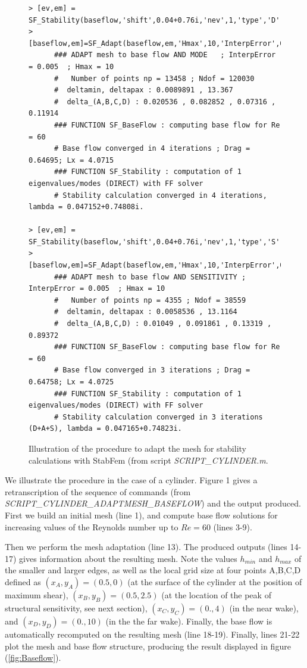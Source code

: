 \documentclass[twocolumn,10pt]{asme2ej}
\begin{document}
\begin{figure}
\small
\begin{lstlisting}
> [ev,em] = SF_Stability(baseflow,'shift',0.04+0.76i,'nev',1,'type','D');
> [baseflow,em]=SF_Adapt(baseflow,em,'Hmax',10,'InterpError',0.005);  
      ### ADAPT mesh to base flow AND MODE   ; InterpError = 0.005  ; Hmax = 10
      #   Number of points np = 13458 ; Ndof = 120030
      #  deltamin, deltapax : 0.0089891 , 13.367
      #  delta_(A,B,C,D) : 0.020536 , 0.082852 , 0.07316 , 0.11914
      ### FUNCTION SF_BaseFlow : computing base flow for Re = 60
      # Base flow converged in 4 iterations ; Drag = 0.64695; Lx = 4.0715
      ### FUNCTION SF_Stability : computation of 1 eigenvalues/modes (DIRECT) with FF solver
      # Stability calculation converged in 4 iterations, lambda = 0.047152+0.74808i.

> [ev,em] = SF_Stability(baseflow,'shift',0.04+0.76i,'nev',1,'type','S');
> [baseflow,em]=SF_Adapt(baseflow,em,'Hmax',10,'InterpError',0.005);
      ### ADAPT mesh to base flow AND SENSITIVITY ; InterpError = 0.005  ; Hmax = 10
      #   Number of points np = 4355 ; Ndof = 38559
      #  deltamin, deltapax : 0.0058536 , 13.1164
      #  delta_(A,B,C,D) : 0.01049 , 0.091861 , 0.13319 , 0.89372
      ### FUNCTION SF_BaseFlow : computing base flow for Re = 60
      # Base flow converged in 3 iterations ; Drag = 0.64758; Lx = 4.0725
      ### FUNCTION SF_Stability : computation of 1 eigenvalues/modes (DIRECT) with FF solver
      # Stability calculation converged in 3 iterations (D+A+S), lambda = 0.047165+0.74823i.

\end{lstlisting}
\normalsize

\caption{Illustration of the procedure to adapt the mesh for stability calculations with StabFem (from script {\em SCRIPT\_CYLINDER.m}. }
\end{figure}



We illustrate the procedure in the case of a cylinder.  Figure 1 gives a retranscription of the sequence of commands (from {\em SCRIPT\_CYLINDER\_ADAPTMESH\_BASEFLOW}) 
and the output produced.
First we build an initial mesh (line 1), and compute base flow solutions for increasing values of the Reynolds number up to $Re = 60$ (lines 3-9).

Then we perform the mesh adaptation (line 13). The produced outputs (lines 14-17) gives information about the resulting mesh. 
Note the values $h_{min}$ and $h_{max}$ of the smaller and larger edges, as well as the local grid size at four points A,B,C,D defined as $(x_A,y_A) = (0.5,0)$ (at the surface of the cylinder at the position of maximum shear), $(x_B,y_B) = (0.5,2.5)$ (at the location of the peak of structural sensitivity, see next section), $(x_C,y_C) = (0.,4)$ (in the near wake), and $(x_D,y_D) = (0.,10)$ (in the the far wake). Finally, the base flow is automatically recomputed on the resulting mesh (line 18-19). Finally, lines 21-22 plot the mesh and base flow structure, producing the result displayed in figure (\ref{fig:Baseflow}).
\end{document}
